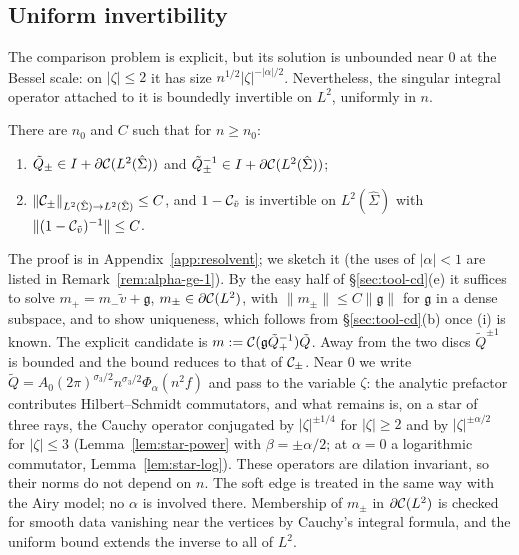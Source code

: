 \subsection{Uniform invertibility}\label{sec:he-resolvent}

The comparison problem is explicit, but its solution is unbounded near $0$ at the Bessel scale: on $|\zeta|\le2$ it has
size $n^{1/2}|\zeta|^{-|\alpha|/2}$. Nevertheless, the singular integral operator attached to it is boundedly invertible on
$L^2$, uniformly in $n$.

\begin{proposition}\label{prop:UR-comparison}
There are $n_0$ and $C$ such that for $n\ge n_0$:
\begin{enumerate}
\item[(i)] $\tilde Q_\pm\in I+\partial\mathcal{C}(L^2(\hat\Sigma))$ and $\tilde Q_\pm^{-1}\in I+\partial\mathcal{C}(L^2(\hat\Sigma))$;
\item[(ii)] $\|\mathcal{C}_\pm\|_{L^2(\hat\Sigma)\to L^2(\hat\Sigma)}\le C$, and $1-\mathcal{C}_{\tilde v}$ is invertible on
  $L^2(\hat\Sigma)$ with $\|(1-\mathcal{C}_{\tilde v})^{-1}\|\le C$.
\end{enumerate}
\end{proposition}

The proof is in Appendix~\ref{app:resolvent}; we sketch it (the uses of $|\alpha|<1$ are listed in
Remark~\ref{rem:alpha-ge-1}). By the easy half of \S\ref{sec:tool-cd}(e) it suffices to solve $m_+=m_-\tilde v+\mathfrak g$,
$m_\pm\in\partial\mathcal{C}(L^2)$, with $\|m_\pm\|\le C\|\mathfrak g\|$ for $\mathfrak g$ in a dense subspace, and to show uniqueness,
which follows from \S\ref{sec:tool-cd}(b) once (i) is known. The explicit candidate is $m:=\mathcal{C}(\mathfrak g\tilde
Q_+^{-1})\tilde Q$. Away from the two discs $\tilde Q^{\pm1}$ is bounded and the bound reduces to that of $\mathcal{C}_\pm$.
Near $0$ we write $\tilde Q=A_0(2\pi)^{\sigma_3/2}n^{\sigma_3/2}\Phi_\alpha(n^2f)$ and pass to the variable $\zeta$: the
analytic prefactor contributes Hilbert--Schmidt commutators, and what remains is, on a star of three rays, the Cauchy
operator conjugated by $|\zeta|^{\pm1/4}$ for $|\zeta|\ge2$ and by $|\zeta|^{\pm\alpha/2}$ for $|\zeta|\le3$
(Lemma~\ref{lem:star-power} with $\beta=\pm\alpha/2$; at $\alpha=0$ a logarithmic commutator, Lemma~\ref{lem:star-log}). These
operators are dilation invariant, so their norms do not depend on $n$. The soft edge is treated in the same way with the
Airy model; no $\alpha$ is involved there. Membership of $m_\pm$ in $\partial\mathcal{C}(L^2)$ is checked for smooth data vanishing near
the vertices by Cauchy's integral formula, and the uniform bound extends the inverse to all of $L^2$.

